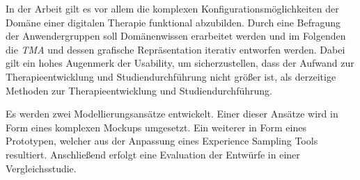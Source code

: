 In der Arbeit gilt es vor allem die komplexen Konfigurationsmöglichkeiten der Domäne einer digitalen Therapie funktional abzubilden. Durch eine Befragung der Anwendergruppen soll Domänenwissen erarbeitet werden und im Folgenden die \emph{TMA} und dessen grafische Repräsentation iterativ entworfen werden. Dabei gilt ein hohes Augenmerk der Usability, um sicherzustellen, dass der Aufwand zur Therapieentwicklung und Studiendurchführung nicht größer ist, als derzeitige Methoden zur Therapieentwicklung und Studiendurchführung.

Es werden zwei Modellierungsansätze entwickelt. Einer dieser Ansätze wird in Form eines komplexen Mockups umgesetzt. Ein weiterer in Form eines Prototypen, welcher aus der Anpassung eines Experience Sampling Tools resultiert. Anschließend erfolgt eine Evaluation der Entwürfe in einer Vergleichsstudie. 






